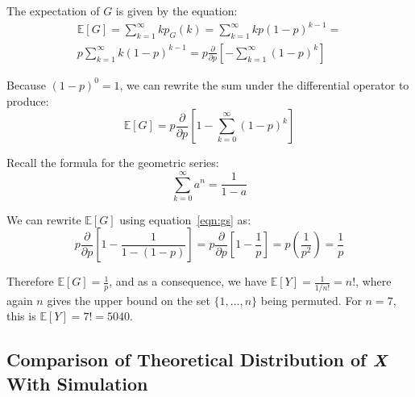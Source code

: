 \documentclass[11pt, oneside]{article}   	%
\begin{document}
The expectation of $G$ is given by the equation:
\begin{equation*}
\begin{split}
\mathbb{E}[G] =
\sum_{k = 1}^{\infty}k p_G(k) =
\sum_{k = 1}^{\infty}k p(1-p)^{k-1} =\\
p \sum_{k = 1}^{\infty}k (1 - p)^{k-1} =
p \frac{\partial}{\partial p} \left[-\sum_{k = 1}^{\infty}(1 - p)^k\right]
\end{split}
\end{equation*}

Because $(1-p)^{0} = 1$, we can rewrite the sum under the differential operator to produce:
\begin{equation*}
\mathbb{E}[G] = p \frac{\partial}{\partial p} \left[1 - \sum_{k = 0}^{\infty}(1 - p)^k\right]
\end{equation*}

Recall the formula for the geometric series:
\begin{equation}
\sum_{k = 0}^{\infty}a^n = \frac{1}{1-a}
\label{eqn:gs}
\end{equation}

We can rewrite $\mathbb{E}[G]$ using equation~\ref{eqn:gs} as:
\begin{equation*}
p \frac{\partial}{\partial p} \left[1 - \frac{1}{1 - (1 - p)}\right] =
p \frac{\partial}{\partial p} \left[1 - \frac{1}{p}\right] =
p \left(\frac{1}{p^2}\right) =
\frac{1}{p}
\end{equation*}

Therefore $\mathbb{E}[G] = \frac{1}{p}$, and as a consequence, we have $\mathbb{E}[Y] = \frac{1}{1/n!} = n!$, where again $n$ gives the upper bound on the set $\{1, \dots, n\}$ being permuted. For $n = 7$, this is $\mathbb{E}[Y] = 7! = 5040$.

\subsection{Comparison of Theoretical Distribution of \textit{X} With Simulation}
\end{document}
